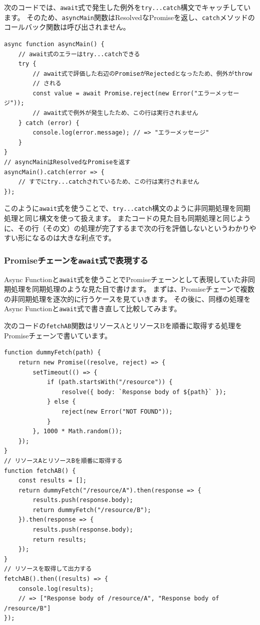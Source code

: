 次のコードでは、\texttt{await}式で発生した例外を\texttt{try...catch}構文でキャッチしています。
そのため、\texttt{asyncMain}関数はResolvedなPromiseを返し、\texttt{catch}メソッドのコールバック関数は呼び出されません。

\begin{lstlisting}
async function asyncMain() {
    // await式のエラーはtry...catchできる
    try {
        // await式で評価した右辺のPromiseがRejectedとなったため、例外がthrow
        // される
        const value = await Promise.reject(new Error("エラーメッセージ"));
        // await式で例外が発生したため、この行は実行されません
    } catch (error) {
        console.log(error.message); // => "エラーメッセージ"
    }
}
// asyncMainはResolvedなPromiseを返す
asyncMain().catch(error => {
    // すでにtry...catchされているため、この行は実行されません
});
\end{lstlisting}

このように\texttt{await}式を使うことで、\texttt{try...catch}構文のように非同期処理を同期処理と同じ構文を使って扱えます。
またコードの見た目も同期処理と同じように、その行（その文）の処理が完了するまで次の行を評価しないというわかりやすい形になるのは大きな利点です。

\hypertarget{promise-chain-to-async-function}{%
\subsubsection{\texorpdfstring{Promiseチェーンを\texttt{await}式で表現する}{Promiseチェーンをawait式で表現する}}\label{promise-chain-to-async-function}}

Async
Functionと\texttt{await}式を使うことでPromiseチェーンとして表現していた非同期処理を同期処理のような見た目で書けます。
まずは、Promiseチェーンで複数の非同期処理を逐次的に行うケースを見ていきます。
その後に、同様の処理をAsync
Functionと\texttt{await}式で書き直して比較してみます。

次のコードの\texttt{fetchAB}関数はリソースAとリソースBを順番に取得する処理をPromiseチェーンで書いています。

\begin{lstlisting}
function dummyFetch(path) {
    return new Promise((resolve, reject) => {
        setTimeout(() => {
            if (path.startsWith("/resource")) {
                resolve({ body: `Response body of ${path}` });
            } else {
                reject(new Error("NOT FOUND"));
            }
        }, 1000 * Math.random());
    });
}
// リソースAとリソースBを順番に取得する
function fetchAB() {
    const results = [];
    return dummyFetch("/resource/A").then(response => {
        results.push(response.body);
        return dummyFetch("/resource/B");
    }).then(response => {
        results.push(response.body);
        return results;
    });
}
// リソースを取得して出力する
fetchAB().then((results) => {
    console.log(results); 
    // => ["Response body of /resource/A", "Response body of /resource/B"]
});
\end{lstlisting}

